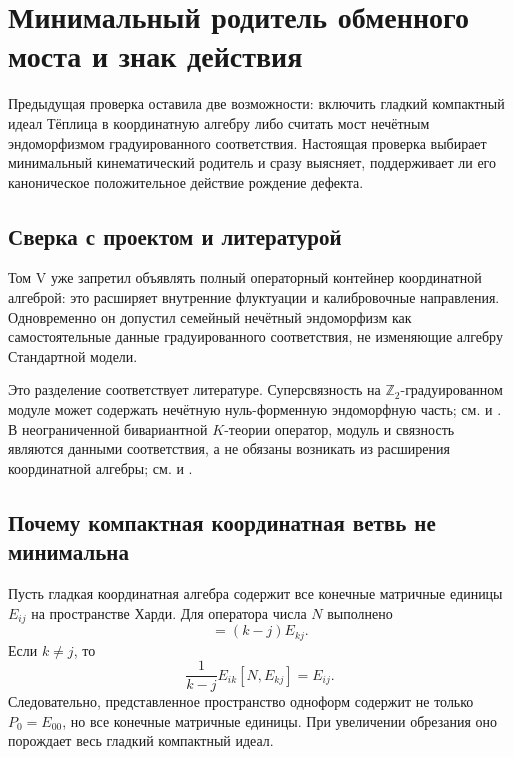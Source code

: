 \chapter{Минимальный родитель обменного моста и знак действия}

Предыдущая проверка оставила две возможности: включить гладкий компактный идеал
Тёплица в координатную алгебру либо считать мост нечётным эндоморфизмом
градуированного соответствия. Настоящая проверка выбирает минимальный
кинематический родитель и сразу выясняет, поддерживает ли его каноническое
положительное действие рождение дефекта.

\section{Сверка с проектом и литературой}

Том V уже запретил объявлять полный операторный контейнер координатной
алгеброй: это расширяет внутренние флуктуации и калибровочные направления.
Одновременно он допустил семейный нечётный эндоморфизм как самостоятельные
данные градуированного соответствия, не изменяющие алгебру Стандартной
модели.

Это разделение соответствует литературе. Суперсвязность на
$\mathbb Z_2$-градуированном модуле может содержать нечётную нуль-форменную
эндоморфную часть; см.  и
. В неограниченной бивариантной $K$-теории оператор,
модуль и связность являются данными соответствия, а не обязаны возникать
из расширения координатной алгебры; см.  и
.

\section{Почему компактная координатная ветвь не минимальна}

Пусть гладкая координатная алгебра содержит все конечные матричные единицы
$E_{ij}$ на пространстве Харди. Для оператора числа $N$ выполнено
\begin{equation}
 [N,E_{kj}]=(k-j)E_{kj}.
\end{equation}
Если $k\ne j$, то
\begin{equation}
 \frac1{k-j}E_{ik}[N,E_{kj}]=E_{ij}.
 \label{eq:v6-all-compacts-as-oneforms}
\end{equation}
Следовательно, представленное пространство одноформ содержит не только
$P_0=E_{00}$, но все конечные матричные единицы. При увеличении обрезания
оно порождает весь гладкий компактный идеал.

